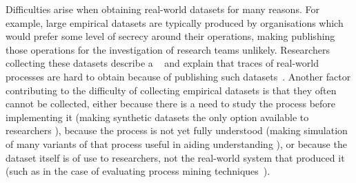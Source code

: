 Difficulties arise when obtaining real-world datasets for many reasons. For
example, large empirical datasets are typically produced by organisations which
would prefer some level of secrecy around their operations, making publishing
those operations for the investigation of research teams unlikely. Researchers
collecting these datasets describe a ~\cite{bpi_ten_years_of_datasets} and explain that traces of real-world
processes are hard to obtain because  of publishing such
datasets~\cite{bpi_ten_years_of_datasets}. Another factor contributing to the
difficulty of collecting empirical datasets is that they often cannot be
collected, either because there is a need to study the process before
implementing it (making synthetic datasets the only option available to
researchers ), because
the process is not yet fully understood (making simulation of many variants of
that process useful in aiding understanding ), or because the dataset itself
is of use to researchers, not the real-world system that produced it (such as in
the case of evaluating process mining
techniques~\cite{van2004process,agrawal1998mining}). 


